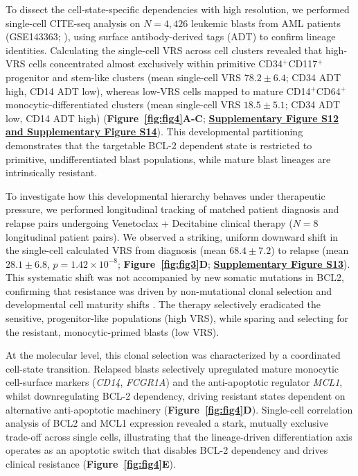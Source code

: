 \documentclass[11pt,a4paper]{article}
\begin{document}
To dissect the cell-state-specific dependencies with high resolution, we performed single-cell CITE-seq analysis on $N=4{,}426$ leukemic blasts from AML patients (GSE143363; \cite{pei2020monocytic}), using surface antibody-derived tags (ADT) to confirm lineage identities. Calculating the single-cell VRS across cell clusters revealed that high-VRS cells concentrated almost exclusively within primitive CD34$^+$CD117$^+$ progenitor and stem-like clusters (mean single-cell VRS $78.2 \pm 6.4$; CD34 ADT high, CD14 ADT low), whereas low-VRS cells mapped to mature CD14$^+$CD64$^+$ monocytic-differentiated clusters (mean single-cell VRS $18.5 \pm 5.1$; CD34 ADT low, CD14 ADT high) (\textbf{Figure~\ref{fig:fig4}A-C}; \textbf{\href{Supplementary_Methods.pdf}{\textbf{Supplementary Figure S12 and Supplementary Figure S14}}}). This developmental partitioning demonstrates that the targetable BCL-2 dependent state is restricted to primitive, undifferentiated blast populations, while mature blast lineages are intrinsically resistant.

To investigate how this developmental hierarchy behaves under therapeutic pressure, we performed longitudinal tracking of matched patient diagnosis and relapse pairs undergoing Venetoclax + Decitabine clinical therapy ($N=8$ longitudinal patient pairs). We observed a striking, uniform downward shift in the single-cell calculated VRS from diagnosis (mean $68.4 \pm 7.2$) to relapse (mean $28.1 \pm 6.8$, $p=1.42\times10^{-8}$; \textbf{Figure~\ref{fig:fig3}D}; \textbf{\href{Supplementary_Methods.pdf}{\textbf{Supplementary Figure S13}}}). This systematic shift was not accompanied by new somatic mutations in BCL2, confirming that resistance was driven by non-mutational clonal selection and developmental cell maturity shifts \cite{pollyea2020venetoclax,stahl2021venetoclax}. The therapy selectively eradicated the sensitive, progenitor-like populations (high VRS), while sparing and selecting for the resistant, monocytic-primed blasts (low VRS).

At the molecular level, this clonal selection was characterized by a coordinated cell-state transition. Relapsed blasts selectively upregulated mature monocytic cell-surface markers (\textit{CD14}, \textit{FCGR1A}) and the anti-apoptotic regulator \textit{MCL1}, whilst downregulating BCL-2 dependency, driving resistant states dependent on alternative anti-apoptotic machinery \cite{moujalled2019mcl1,ramsey2018mcl1} (\textbf{Figure~\ref{fig:fig4}D}). Single-cell correlation analysis of BCL2 and MCL1 expression revealed a stark, mutually exclusive trade-off across single cells, illustrating that the lineage-driven differentiation axis operates as an apoptotic switch that disables BCL-2 dependency and drives clinical resistance (\textbf{Figure~\ref{fig:fig4}E}).
\end{document}
